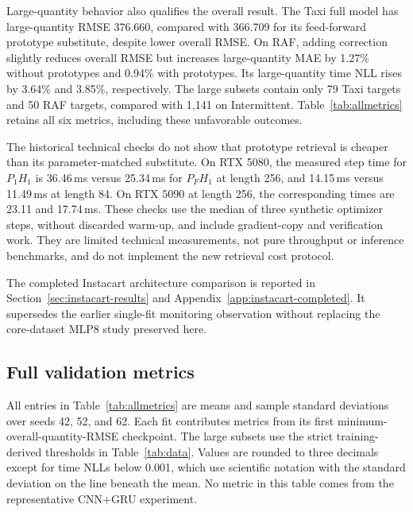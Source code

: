 \documentclass[runningheads]{llncs}
\begin{document}
Large-quantity behavior also qualifies the overall result. The Taxi full model has large-quantity RMSE 376.660, compared with 366.709 for its feed-forward prototype substitute, despite lower overall RMSE. On RAF, adding correction slightly reduces overall RMSE but increases large-quantity MAE by 1.27\% without prototypes and 0.94\% with prototypes. Its large-quantity time NLL rises by 3.64\% and 3.85\%, respectively. The large subsets contain only 79 Taxi targets and 50 RAF targets, compared with 1,141 on Intermittent. Table~\ref{tab:allmetrics} retains all six metrics, including these unfavorable outcomes.

The historical technical checks do not show that prototype retrieval is cheaper than its parameter-matched substitute. On RTX 5080, the measured step time for $P_1H_1$ is 36.46\,ms versus 25.34\,ms for $P_FH_1$ at length 256, and 14.15\,ms versus 11.49\,ms at length 84. On RTX 5090 at length 256, the corresponding times are 23.11 and 17.74\,ms. These checks use the median of three synthetic optimizer steps, without discarded warm-up, and include gradient-copy and verification work. They are limited technical measurements, not pure throughput or inference benchmarks, and do not implement the new retrieval cost protocol.

The completed Instacart architecture comparison is reported in Section~\ref{sec:instacart-results} and Appendix~\ref{app:instacart-completed}. It supersedes the earlier single-fit monitoring observation without replacing the core-dataset MLP8 study preserved here.

\subsection{Full validation metrics}
All entries in Table~\ref{tab:allmetrics} are means and sample standard deviations over seeds 42, 52, and 62. Each fit contributes metrics from its first minimum-overall-quantity-RMSE checkpoint. The large subsets use the strict training-derived thresholds in Table~\ref{tab:data}. Values are rounded to three decimals except for time NLLs below 0.001, which use scientific notation with the standard deviation on the line beneath the mean. No metric in this table comes from the representative CNN+GRU experiment.
\end{document}
